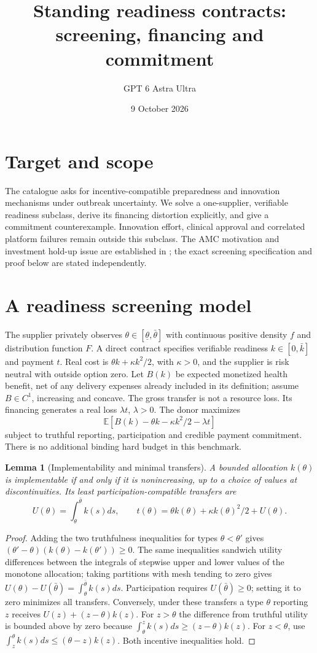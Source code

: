 \documentclass[11pt]{article}
\title{Standing readiness contracts: screening, financing and commitment}
\author{GPT 6 Astra Ultra}
\date{9 October 2026}
\newtheorem{lemma}[theorem]{Lemma}
\theoremstyle{definition}
\begin{document}
\maketitle
\section*{Target and scope}
The catalogue asks for incentive-compatible preparedness and innovation
mechanisms under outbreak uncertainty. We solve a one-supplier, verifiable
readiness subclass, derive its financing distortion explicitly, and give a
commitment counterexample. Innovation effort, clinical approval and correlated
platform failures remain outside this subclass. The AMC motivation and
investment hold-up issue are established in \cite{kls,kremer}; the exact
screening specification and proof below are stated independently.

\section*{A readiness screening model}
The supplier privately observes $\theta\in[\underline\theta,\bar\theta]$
with continuous positive density $f$ and distribution function $F$.
A direct contract specifies verifiable readiness $k\in[0,\bar k]$ and
payment $t$. Real cost is $\theta k+\kappa k^2/2$, with $\kappa>0$,
and the supplier is risk neutral with outside option zero. Let $B(k)$
be expected monetized health benefit, net of any delivery expenses already
included in its definition; assume $B\in C^1$, increasing and concave.
The gross transfer is not a resource loss. Its financing generates a real
loss $\lambda t$, $\lambda>0$. The donor maximizes
\[
 \mathbb E[B(k)-\theta k-\kappa k^2/2-\lambda t]
\]
subject to truthful reporting, participation and credible payment commitment.
There is no additional binding hard budget in this benchmark.

\begin{lemma}[Implementability and minimal transfers]
A bounded allocation $k(\theta)$ is implementable if and only if it is
nonincreasing, up to a choice of values at discontinuities. Its least
participation-compatible transfers are
\[
 U(\theta)=\int_\theta^{\bar\theta}k(s)ds,\qquad
 t(\theta)=\theta k(\theta)+\kappa k(\theta)^2/2+U(\theta).
\]
\end{lemma}
\begin{proof}
Adding the two truthfulness inequalities for types $\theta<\theta'$
gives $(\theta'-\theta)(k(\theta)-k(\theta'))\ge0$.
The same inequalities sandwich utility differences between the integrals
of stepwise upper and lower values of the monotone allocation; taking
partitions with mesh tending to zero gives
$U(\theta)-U(\bar\theta)=\int_\theta^{\bar\theta}k(s)ds$.
Participation requires $U(\bar\theta)\ge0$; setting it to zero minimizes
all transfers. Conversely, under these transfers a type $\theta$ reporting
$z$ receives $U(z)+(z-\theta)k(z)$. For $z>\theta$ the difference from
truthful utility is bounded above by zero because
$\int_\theta^z k(s)ds\ge(z-\theta)k(z)$. For $z<\theta$, use
$\int_z^\theta k(s)ds\le(\theta-z)k(z)$. Both incentive inequalities hold.
\end{proof}
\end{document}
